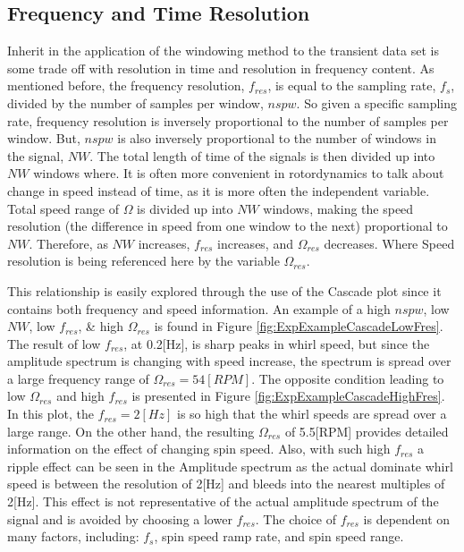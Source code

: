 \subsection{Frequency and Time Resolution}\label{Resolution}
Inherit in the application of the windowing method to the transient data set is some trade off with resolution in time and resolution in frequency content. As mentioned before, the frequency resolution, $ f_{res} $, is equal to the sampling rate, $ f_s $, divided by the number of samples per window, $ nspw $. So given a specific sampling rate, frequency resolution is inversely proportional to the number of samples per window. But, $ nspw $ is also inversely proportional to the number of windows in the signal, $ NW $. The total length of time of the signals is then divided up into $ NW $ windows where. It is often more convenient in rotordynamics to talk about change in speed instead of time, as it is more often the independent variable. Total speed range of $ \Omega $ is divided up into $ NW $ windows, making the speed resolution (the difference in speed from one window to the next) proportional to $ NW $. Therefore, as $ NW $ increases, $ f_{res} $ increases, and $ \Omega_{res} $ decreases. Where Speed resolution is being referenced here by the variable $ \Omega_{res} $.\par
This relationship is easily explored through the use of the Cascade plot since it contains both frequency and speed information. An example of a high $ nspw $, low $ NW $, low $ f_{res} $, \& high $ \Omega_{res} $ is found in Figure \ref{fig:ExpExampleCascadeLowFres}. The result of low $ f_{res} $, at 0.2[Hz], is sharp peaks in whirl speed, but since the amplitude spectrum is changing with speed increase, the spectrum is spread over a large frequency range of $ \Omega_{res}=54[RPM] $. The opposite condition leading to low $ \Omega_{res} $ and high $ f_{res} $ is presented in Figure \ref{fig:ExpExampleCascadeHighFres}. In this plot, the $ f_{res}=2[Hz] $ is so high that the whirl speeds are spread over a large range. On the other hand, the resulting $ \Omega_{res} $ of 5.5[RPM] provides detailed information on the effect of changing spin speed. Also, with such high $ f_{res} $ a ripple effect can be seen in the Amplitude spectrum as the actual dominate whirl speed is between the resolution of 2[Hz] and bleeds into the nearest multiples of 2[Hz]. This effect is not representative of the actual amplitude spectrum of the signal and is avoided by choosing a lower $ f_{res} $. The choice of $ f_{res} $ is dependent on many factors, including: $ f_s $, spin speed ramp rate, and spin speed range.  
